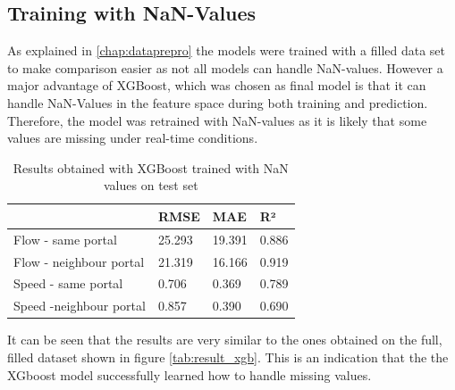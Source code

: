 	\subsection{Training with NaN-Values} \label{chap:nan}
	As explained in \ref{chap:dataprepro} the models were trained with a filled data set to make comparison easier as not all models can handle NaN-values. 
	However a major advantage of XGBoost, which was chosen as final model is that it can handle NaN-Values in the feature space during both training and prediction. 
	Therefore, the model was retrained with NaN-values as it is likely that some values are missing under real-time conditions.
	\begin{table}[H]
		\centering
		\caption{Results obtained with XGBoost trained with NaN values on test set}
		\label{tab:result_xgb_nan}
		\begin{tabular}{l|lll}
			& RMSE   & MAE    & R²    \\
			\hline
			Flow - same portal      &25.293& 19.391& 0.886\\
			Flow - neighbour portal &  21.319& 16.166& 0.919\\
			Speed - same portal     & 0.706 & 0.369& 0.789\\
			Speed -neighbour portal &0.857& 0.390& 0.690
		\end{tabular}
	\end{table}
	\noindent It can be seen that the results are very similar to the ones obtained on the full, filled dataset shown in figure \ref{tab:result_xgb}. This is an indication that the the XGboost model successfully learned how to handle missing values.
